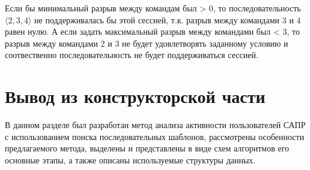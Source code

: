 Если бы минимальный разрыв между командам был > 0, то последовательность $\langle2,3,4\rangle$ не поддерживалась бы этой сессией, т.к. разрыв между командами 3 и 4 равен нулю. А если задать максимальный разрыв между командами был < 3, то разрыв между командами 2 и 3 не  будет удовлетворять заданному условию и соотвественно последовательность не будет поддерживаться сессией.

\section*{Вывод из конструкторской части}
В данном разделе был разработан метод анализа активности пользователей САПР с использованием поиска последовательных шаблонов, рассмотрены особенности предлагаемого метода, выделены и представлены в виде схем алгоритмов его основные этапы, а также описаны используемые структуры данных.